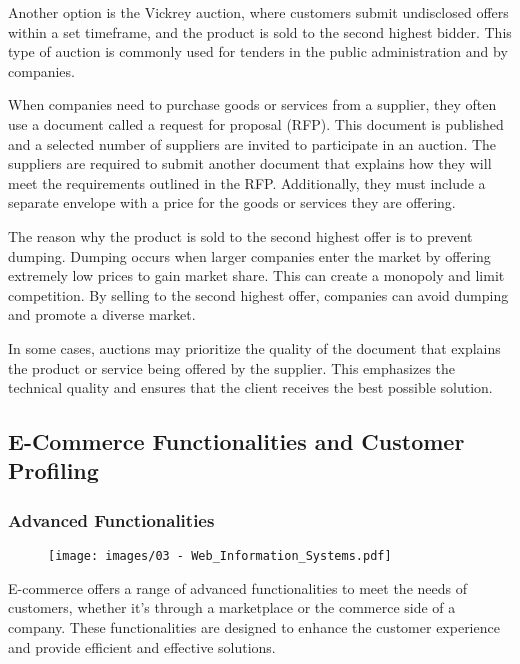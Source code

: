 Another option is the Vickrey auction, where customers submit undisclosed offers within
a set timeframe, and the product is sold to the second highest bidder.
This type of auction is commonly used for tenders in the public
administration and by companies.

When companies need to purchase goods or services from a supplier, they
often use a document called a request for proposal (RFP). This document
is published and a selected number of suppliers are invited to
participate in an auction. The suppliers are required to submit another
document that explains how they will meet the requirements outlined in
the RFP. Additionally, they must include a separate envelope with a
price for the goods or services they are offering.

The reason why the product is sold to the second highest offer is to
prevent dumping. Dumping occurs when larger companies enter the market
by offering extremely low prices to gain market share. This can create a
monopoly and limit competition. By selling to the second highest offer,
companies can avoid dumping and promote a diverse market.

In some cases, auctions may prioritize the quality of the document that
explains the product or service being offered by the supplier. This
emphasizes the technical quality and ensures that the client receives
the best possible solution.


\subsection{E-Commerce Functionalities and Customer
  Profiling}\label{e-commerce-functionalities-and-customer-profiling}

\subsubsection{Advanced Functionalities}\label{advanced-functionalities}

\begin{figure}[!h]
  \centering
  \texttt{[image: images/03 - Web\_Information\_Systems.pdf]}
\end{figure}

E-commerce offers a range of advanced functionalities to meet the needs
of customers, whether it's through a marketplace or the commerce side of
a company. These functionalities are designed to enhance the customer
experience and provide efficient and effective solutions.


